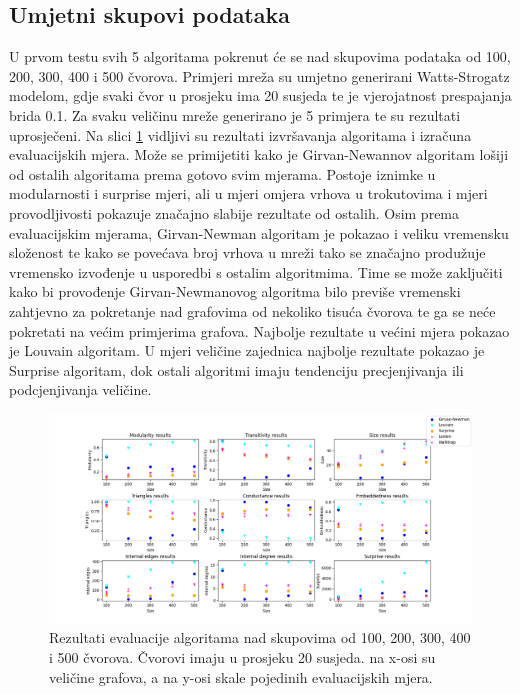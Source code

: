 \subsection{Umjetni skupovi podataka}
U prvom testu svih 5 algoritama pokrenut će se nad skupovima podataka od 100, 200, 300, 400 i 500 čvorova. Primjeri mreža su umjetno generirani Watts-Strogatz modelom, gdje svaki čvor u prosjeku ima 20 susjeda te je vjerojatnost prespajanja brida 0.1. Za svaku veličinu mreže generirano je 5 primjera te su rezultati uprosječeni. Na slici \ref{fig:test1} vidljivi su rezultati izvršavanja algoritama i izračuna evaluacijskih mjera. Može se primijetiti kako je Girvan-Newannov algoritam lošiji od ostalih algoritama prema gotovo svim mjerama. Postoje iznimke u modularnosti i surprise mjeri, ali u mjeri omjera vrhova u trokutovima i  mjeri provodljivosti pokazuje značajno slabije rezultate od ostalih. Osim prema evaluacijskim mjerama, Girvan-Newman algoritam je pokazao i veliku vremensku složenost te kako se povećava broj vrhova u mreži tako se značajno produžuje vremensko izvođenje u usporedbi s ostalim algoritmima. Time se može zaključiti kako bi provođenje Girvan-Newmanovog algoritma bilo previše vremenski zahtjevno za pokretanje nad grafovima od nekoliko tisuća čvorova te ga se neće pokretati na većim primjerima grafova. Najbolje rezultate u većini mjera pokazao je Louvain algoritam. U mjeri veličine zajednica najbolje rezultate pokazao je Surprise algoritam, dok ostali algoritmi imaju tendenciju precjenjivanja ili podcjenjivanja veličine.

\begin{figure}
	\includegraphics[width=\linewidth]{images/test1.png}
	\caption{Rezultati evaluacije algoritama nad skupovima od 100, 200, 300, 400 i 500 čvorova. Čvorovi imaju u prosjeku 20 susjeda. na x-osi su veličine grafova, a na y-osi skale pojedinih evaluacijskih mjera.}
	\label{fig:test1}
\end{figure}


